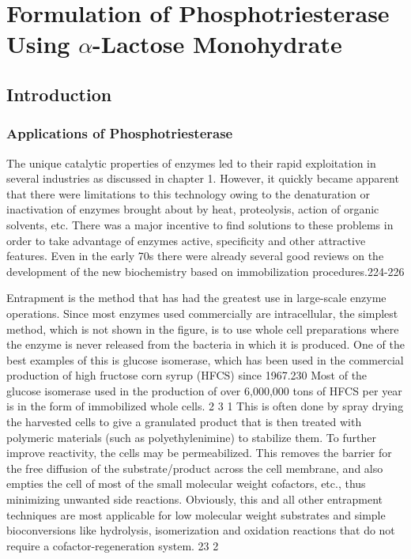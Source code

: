 \chapter{Formulation of Phosphotriesterase Using $\alpha$-Lactose Monohydrate} 
\label{chap:lactose}

\begin{refsection}

\section{Introduction}

\subsection{Applications of Phosphotriesterase}

The unique catalytic properties of enzymes led to their rapid exploitation in
several industries as discussed in chapter 1. However, it quickly became
apparent that there were limitations to this technology owing to the
denaturation or inactivation of enzymes brought about by heat, proteolysis,
action of organic solvents, etc.  There was a major incentive to find solutions
to these problems in order to take advantage of enzymes active, specificity and
other attractive features.  Even in the early 70s there were already several
good reviews on the development of the new biochemistry based on immobilization
procedures.224-226

Entrapment is the method that has had the greatest use in large-scale enzyme
operations. Since most enzymes used commercially are intracellular, the
simplest method, which is not shown in the figure, is to use whole cell
preparations where the enzyme is never released from the bacteria in which it
is produced. One of the best examples of this is glucose isomerase, which has
been used in the commercial production of high fructose corn syrup (HFCS) since
1967.230 Most of the glucose isomerase used in the production of over 6,000,000
tons of HFCS per year is in the form of immobilized whole cells. 2 3 1 This is
often done by spray drying the harvested cells to give a granulated product
that is then treated with polymeric materials (such as polyethylenimine) to
stabilize them. To further improve reactivity, the cells may be permeabilized.
This removes the barrier for the free diffusion of the substrate/product across
the cell membrane, and also empties the cell of most of the small molecular
weight cofactors, etc., thus minimizing unwanted side reactions. Obviously,
this and all other entrapment techniques are most applicable for low molecular
weight substrates and simple bioconversions like hydrolysis, isomerization and
oxidation reactions that do not require a cofactor-regeneration system. 23 2


\end{refsection}
